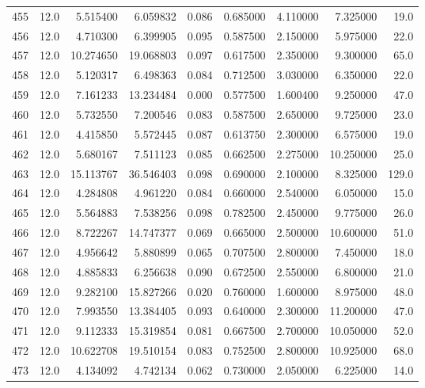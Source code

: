 \begin{tabular}{lrrrrrrrr}
455  &   12.0 &   5.515400 &   6.059832 &  0.086 &  0.685000 &  4.110000 &   7.325000 &   19.0 \\
456  &   12.0 &   4.710300 &   6.399905 &  0.095 &  0.587500 &  2.150000 &   5.975000 &   22.0 \\
457  &   12.0 &  10.274650 &  19.068803 &  0.097 &  0.617500 &  2.350000 &   9.300000 &   65.0 \\
458  &   12.0 &   5.120317 &   6.498363 &  0.084 &  0.712500 &  3.030000 &   6.350000 &   22.0 \\
459  &   12.0 &   7.161233 &  13.234484 &  0.000 &  0.577500 &  1.600400 &   9.250000 &   47.0 \\
460  &   12.0 &   5.732550 &   7.200546 &  0.083 &  0.587500 &  2.650000 &   9.725000 &   23.0 \\
461  &   12.0 &   4.415850 &   5.572445 &  0.087 &  0.613750 &  2.300000 &   6.575000 &   19.0 \\
462  &   12.0 &   5.680167 &   7.511123 &  0.085 &  0.662500 &  2.275000 &  10.250000 &   25.0 \\
463  &   12.0 &  15.113767 &  36.546403 &  0.098 &  0.690000 &  2.100000 &   8.325000 &  129.0 \\
464  &   12.0 &   4.284808 &   4.961220 &  0.084 &  0.660000 &  2.540000 &   6.050000 &   15.0 \\
465  &   12.0 &   5.564883 &   7.538256 &  0.098 &  0.782500 &  2.450000 &   9.775000 &   26.0 \\
466  &   12.0 &   8.722267 &  14.747377 &  0.069 &  0.665000 &  2.500000 &  10.600000 &   51.0 \\
467  &   12.0 &   4.956642 &   5.880899 &  0.065 &  0.707500 &  2.800000 &   7.450000 &   18.0 \\
468  &   12.0 &   4.885833 &   6.256638 &  0.090 &  0.672500 &  2.550000 &   6.800000 &   21.0 \\
469  &   12.0 &   9.282100 &  15.827266 &  0.020 &  0.760000 &  1.600000 &   8.975000 &   48.0 \\
470  &   12.0 &   7.993550 &  13.384405 &  0.093 &  0.640000 &  2.300000 &  11.200000 &   47.0 \\
471  &   12.0 &   9.112333 &  15.319854 &  0.081 &  0.667500 &  2.700000 &  10.050000 &   52.0 \\
472  &   12.0 &  10.622708 &  19.510154 &  0.083 &  0.752500 &  2.800000 &  10.925000 &   68.0 \\
473  &   12.0 &   4.134092 &   4.742134 &  0.062 &  0.730000 &  2.050000 &   6.225000 &   14.0 \\

\end{tabular}
